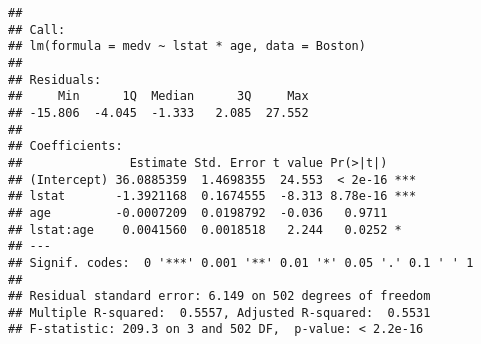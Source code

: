 \documentclass[
]{article}
\begin{document}
\begin{verbatim}
## 
## Call:
## lm(formula = medv ~ lstat * age, data = Boston)
## 
## Residuals:
##     Min      1Q  Median      3Q     Max 
## -15.806  -4.045  -1.333   2.085  27.552 
## 
## Coefficients:
##               Estimate Std. Error t value Pr(>|t|)    
## (Intercept) 36.0885359  1.4698355  24.553  < 2e-16 ***
## lstat       -1.3921168  0.1674555  -8.313 8.78e-16 ***
## age         -0.0007209  0.0198792  -0.036   0.9711    
## lstat:age    0.0041560  0.0018518   2.244   0.0252 *  
## ---
## Signif. codes:  0 '***' 0.001 '**' 0.01 '*' 0.05 '.' 0.1 ' ' 1
## 
## Residual standard error: 6.149 on 502 degrees of freedom
## Multiple R-squared:  0.5557, Adjusted R-squared:  0.5531 
## F-statistic: 209.3 on 3 and 502 DF,  p-value: < 2.2e-16
\end{verbatim}
\end{document}
